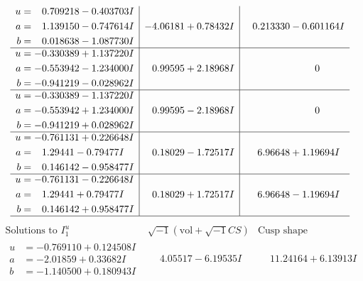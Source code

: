 \documentclass[1p]{elsarticle_modified}
\theoremstyle{definition}
\newcommand{\I}{\sqrt{-1}}
\begin{document}
$$\begin{array}{c|c|c}
\begin{aligned}
u &= \phantom{-}0.709218 - 0.403703 I \\
a &= \phantom{-}1.139150 - 0.747614 I \\
b &= \phantom{-}0.018638 - 1.087730 I\end{aligned}
 & -4.06181 + 0.78432 I & \phantom{-}0.213330 - 0.601164 I \\ \hline\begin{aligned}
u &= -0.330389 + 1.137220 I \\
a &= -0.553942 - 1.234000 I \\
b &= -0.941219 - 0.028962 I\end{aligned}
 & \phantom{-}0.99595 + 2.18968 I & \phantom{-0.000000 } 0 \\ \hline\begin{aligned}
u &= -0.330389 - 1.137220 I \\
a &= -0.553942 + 1.234000 I \\
b &= -0.941219 + 0.028962 I\end{aligned}
 & \phantom{-}0.99595 - 2.18968 I & \phantom{-0.000000 } 0 \\ \hline\begin{aligned}
u &= -0.761131 + 0.226648 I \\
a &= \phantom{-}1.29441 - 0.79477 I \\
b &= \phantom{-}0.146142 - 0.958477 I\end{aligned}
 & \phantom{-}0.18029 - 1.72517 I & \phantom{-}6.96648 + 1.19694 I \\ \hline\begin{aligned}
u &= -0.761131 - 0.226648 I \\
a &= \phantom{-}1.29441 + 0.79477 I \\
b &= \phantom{-}0.146142 + 0.958477 I\end{aligned}
 & \phantom{-}0.18029 + 1.72517 I & \phantom{-}6.96648 - 1.19694 I\\
 \hline 
 \end{array}$$\newpage$$\begin{array}{c|c|c}  
\text{Solutions to }I^u_{1}& \I (\text{vol} + \sqrt{-1}CS) & \text{Cusp shape}\\
 \hline 
\begin{aligned}
u &= -0.769110 + 0.124508 I \\
a &= -2.01859 + 0.33682 I \\
b &= -1.140500 + 0.180943 I\end{aligned}
 & \phantom{-}4.05517 - 6.19535 I & \phantom{-}11.24164 + 6.13913 I \\ \hline\begin{aligned}

\end{aligned}
\end{array}$$
\end{document}
